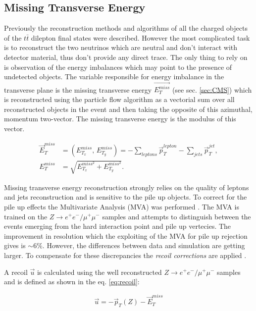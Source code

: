 \subsection{Missing Transverse Energy}

Previously the reconstruction methods and algorithms of all the charged objects of the $t\bar{t}$ dilepton final states were described. However the most complicated 
task is to reconstruct the two neutrinos which are neutral and don't interact with detector material, thus don't provide any direct trace. The only thing to rely on is
observation of the energy imbalances which may point to the presence of undetected objects. The variable responsible for energy imbalance in the transverse plane is 
the missing transverse energy $\vec{E^{miss}_{T}}$ (see sec. \ref{sec:CMS}) which is reconstructed using the particle flow algorithm \cite{CMS-PAS-PFT-09-001}
as a vectorial sum over all reconstructed objects in the event and then taking the opposite of this azimuthal, momentum two-vector. The missing transverse energy is the modulus
of this vector.

\begin{align}
 \vec{E}_{T}^{miss} & = (E_{T_{x}}^{miss}, \, E_{T_{y}}^{miss}) = - \sum_{leptons} \vec{p}_{T}^{lepton} - \sum_{jets} \vec{p}_{T}^{jet}, \\
 E_{T}^{miss} & = \sqrt{E_{T_{x}}^{miss^{2}} + E_{T_{y}}^{miss^{2}}}.
\end{align}

Missing transverse energy reconstruction strongly relies on the quality of leptons and jets reconstruction and is sensitive to the pile up objects. To correct for the 
pile up effects the Multivariate Analysis (MVA) was performed \cite{CMS-PAS-JME-12-002}.
The MVA is trained on the $Z \to e^{+}e^{-} / \mu^{+}\mu^{-}$ samples and attempts to distinguish between the events emerging from the hard interaction point and
pile up vertecies. The improvement in resolution which the exploiting of the MVA for pile up rejection gives is $\sim 6\%$. However, the differences between data
and simulation are getting larger. To compensate for these discrepancies the \textit{recoil corrections} are applied \cite{CMS-PAS-JME-12-002}. 

A recoil $\vec{u}$ is calculated using the well reconstructed $Z \to e^{+}e^{-} / \mu^{+}\mu^{-}$ samples and is defined as shown in the eq. \ref{eq:recoil}:

\begin{equation}
 \vec{u} = - \vec{p}_{T}(Z) - \vec{E}_{T}^{miss}
\end{equation}

